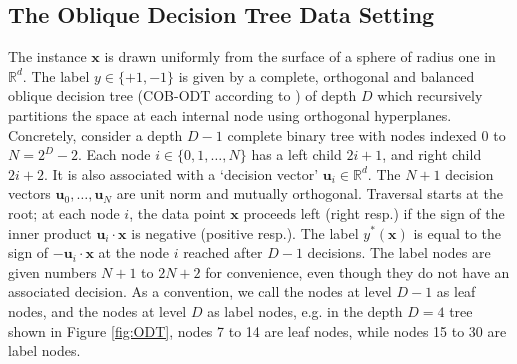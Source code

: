 \documentclass{article}
\theoremstyle{plain}
\theoremstyle{definition}
\theoremstyle{remark}
\newcommand{\R}{{\mathbb R}}
\newcommand{\1}{{\mathbf 1}}
\newcommand{\0}{{\mathbf 0}}
\newcommand{\x}{{\mathbf x}}
\newcommand{\bu}{{\mathbf u}}
\renewcommand{\>}{{\rightarrow}}
\begin{document}
\subsection{The Oblique Decision Tree Data Setting}
\label{sec:ODT_intro}
The instance $\x$ is drawn uniformly from the surface of a sphere of radius one in $\R^d$. The label $y \in\{+1,-1\}$ is given by a complete, orthogonal and balanced oblique decision tree (COB-ODT according to \cite{Banerjee+25}) of depth $D$ which recursively partitions the space at each internal node using orthogonal hyperplanes. Concretely, consider a depth $D-1$ complete binary tree with nodes indexed $0$ to $N = 2^{D}-2$. Each node $i\in\{0,1,\ldots,N\}$ has a left child $2i+1$, and right child $2i+2$. It is also associated with a `decision vector' $\bu_i \in \R^d$. The $N+1$ decision vectors $\bu_0,\ldots,\bu_N$ are unit norm and mutually orthogonal. Traversal starts at the root; at each node $i$, the data point $\x$ proceeds left (right resp.) if the sign of the inner product $\bu_i \cdot \x$ is negative (positive resp.). The label $y^*(\x)$ is  equal to the sign of $-\bu_i\cdot \x$ at the node $i$ reached after $D-1$ decisions. The label nodes are given numbers $N+1$ to $2N+2$ for convenience, even though they do not have an associated decision.  As a convention, we call the nodes at level $D-1$ as leaf nodes, and the nodes at level $D$ as label nodes, e.g. in the depth $D=4$ tree shown in Figure \ref{fig:ODT}, nodes 7 to 14 are leaf nodes, while nodes 15 to 30 are label nodes.
\end{document}
